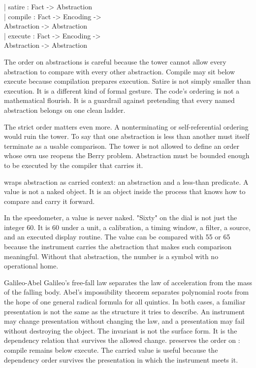 \begin{leancode}
| satire : Fact -> Abstraction\\
| compile : Fact -> Encoding ->\\
\quad Abstraction -> Abstraction\\
| execute : Fact -> Encoding ->\\
\quad Abstraction -> Abstraction
\end{leancode}

The order on abstractions is careful because the tower cannot allow every
abstraction to compare with every other abstraction. Compile may sit below
execute because compilation prepares execution. Satire is not simply smaller
than execution. It is a different kind of formal gesture. The code's ordering
is not a mathematical flourish. It is a guardrail against pretending that every
named abstraction belongs on one clean ladder.

The strict order matters even more. A nonterminating or self-referential
ordering would ruin the tower. To say that one abstraction is less than another
must itself terminate as a usable comparison. The tower is not allowed to
define an order whose own use reopens the Berry problem. Abstraction must be
bounded enough to be executed by the compiler that carries it.

 wraps abstraction as carried context: an abstraction and a
less-than predicate. A value is not a naked object. It is an object inside the
process that knows how to compare and carry it forward.

In the speedometer, a value is never naked. "Sixty" on the dial is not just
the integer 60. It is 60 under a unit, a calibration, a timing window, a
filter, a source, and an executed display routine. The value can be compared
with 55 or 65 because the instrument carries the abstraction that makes such
comparison meaningful. Without that abstraction, the number is a symbol with
no operational home.

\begin{gphenom}{Galileo-Abel}
\label{ph:galileo-abel}
\GPhObs Galileo's free-fall law separates the law of acceleration from the mass
of the falling body. Abel's impossibility theorem separates polynomial roots
from the hope of one general radical formula for all quintics. In both cases, a
familiar presentation is not the same as the structure it tries to describe.
\GPhCon An instrument may change presentation without changing the law, and a
presentation may fail without destroying the object. The invariant is not the
surface form. It is the dependency relation that survives the allowed change.
\GPhSeq {} preserves the order on : compile remains
below execute. The carried value is useful because the dependency order
survives the presentation in which the instrument meets it.
\end{gphenom}

